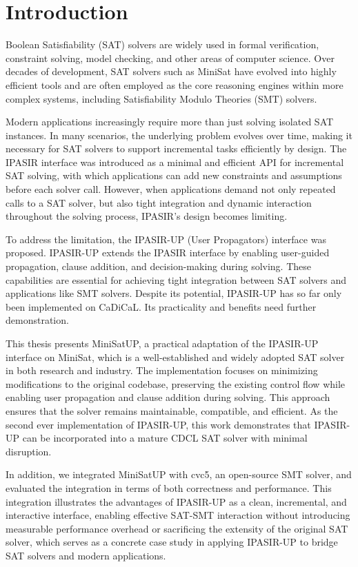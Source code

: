 \chapter{Introduction}

Boolean Satisfiability (SAT) solvers are widely used in formal verification, constraint solving, model checking, and other areas of computer science. Over decades of development, SAT solvers such as MiniSat have evolved into highly efficient tools and are often employed as the core reasoning engines within more complex systems, including Satisfiability Modulo Theories (SMT) solvers.

Modern applications increasingly require more than just solving isolated SAT instances. In many scenarios, the underlying problem evolves over time, making it necessary for SAT solvers to support incremental tasks efficiently by design. The IPASIR interface was introduced as a minimal and efficient API for incremental SAT solving, with which applications can add new constraints and assumptions before each solver call. However, when applications demand not only repeated calls to a SAT solver, but also tight integration and dynamic interaction throughout the solving process, IPASIR's design becomes limiting.

To address the limitation, the IPASIR-UP (User Propagators) interface was proposed. IPASIR-UP extends the IPASIR interface by enabling user-guided propagation, clause addition, and decision-making during solving. These capabilities are essential for achieving tight integration between SAT solvers and applications like SMT solvers. Despite its potential, IPASIR-UP has so far only been implemented on CaDiCaL. Its practicality and benefits need further demonstration.

This thesis presents MiniSatUP, a practical adaptation of the IPASIR-UP interface on MiniSat, which is a well-established and widely adopted SAT solver in both research and industry. The implementation focuses on minimizing modifications to the original codebase, preserving the existing control flow while enabling user propagation and clause addition during solving. This approach ensures that the solver remains maintainable, compatible, and efficient. As the second ever implementation of IPASIR-UP, this work demonstrates that IPASIR-UP can be incorporated into a mature CDCL SAT solver with minimal disruption.

In addition, we integrated MiniSatUP with cvc5, an open-source SMT solver, and evaluated the integration in terms of both correctness and performance. This integration illustrates the advantages of IPASIR-UP as a clean, incremental, and interactive interface, enabling effective SAT-SMT interaction without introducing measurable performance overhead or sacrificing the extensity of the original SAT solver, which serves as a concrete case study in applying IPASIR-UP to bridge SAT solvers and modern applications.

